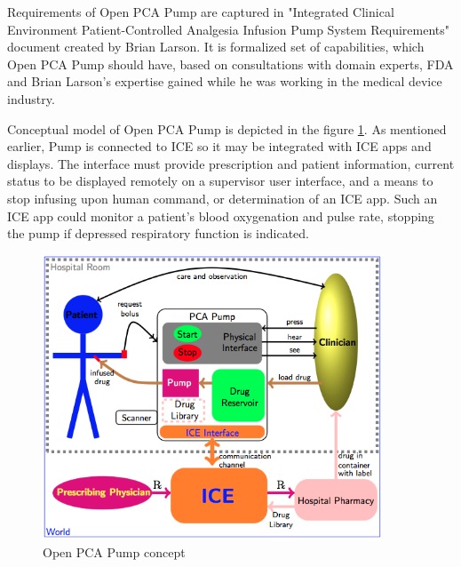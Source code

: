 Requirements of Open PCA Pump are captured in "Integrated Clinical Environment Patient-Controlled Analgesia Infusion Pump System Requirements" document \cite{PcaReq} created by Brian Larson. It is formalized set of capabilities, which Open PCA Pump should have, based on consultations with domain experts, FDA and Brian Larson's expertise gained while he was working in the medical device industry.

Conceptual model of Open PCA Pump is depicted in the figure \ref{figure:ice-pca-pump}. As mentioned earlier, Pump is connected to ICE so it may be integrated with ICE apps and displays. The interface must provide prescription and patient information, current status to be displayed remotely on a supervisor user interface, and a means to stop infusing upon human command, or determination of an ICE app. Such an ICE app could monitor a patient's blood oxygenation and pulse rate, stopping the pump if depressed respiratory function is indicated. \cite{PcaReq}

\begin{figure}[ht]%
    \begin{center}
      \includegraphics[width=0.9\textwidth]{figures/ice-pca-pump.png}      
    \end{center}
    \caption{Open PCA Pump concept}
    \label{figure:ice-pca-pump}
\end{figure}

